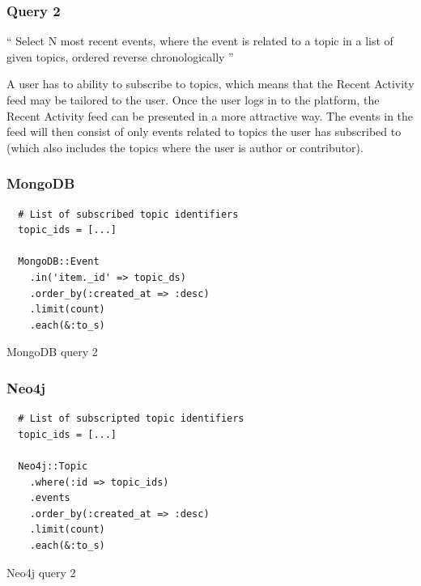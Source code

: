 \subsubsection{Query 2}
\label{subsubsec:query-2}

``
Select N most recent events, where the event is related to a topic in a list of given topics, ordered reverse chronologically
''

A user has to ability to subscribe to topics, which means that the Recent Activity feed may be tailored to the user.
Once the user logs in to the platform, the Recent Activity feed can be presented in a more attractive way.
The events in the feed will then consist of only events related to topics the user has subscribed to (which also includes the topics where the user is author or contributor).

\subsubsection*{MongoDB}

\begin{listing}[H]
  \begin{verbatim}
  # List of subscribed topic identifiers
  topic_ids = [...]

  MongoDB::Event
    .in('item._id' => topic_ds)
    .order_by(:created_at => :desc)
    .limit(count)
    .each(&:to_s)
  \end{verbatim}

  \caption{MongoDB query 2}
  \label{lst:mongodb-query-2}
\end{listing}

\subsubsection*{Neo4j}

\begin{listing}[H]
  \begin{verbatim}
  # List of subscripted topic identifiers
  topic_ids = [...]

  Neo4j::Topic
    .where(:id => topic_ids)
    .events
    .order_by(:created_at => :desc)
    .limit(count)
    .each(&:to_s)
  \end{verbatim}

  \caption{Neo4j query 2}
  \label{lst:neo4j-query-2}
\end{listing}

